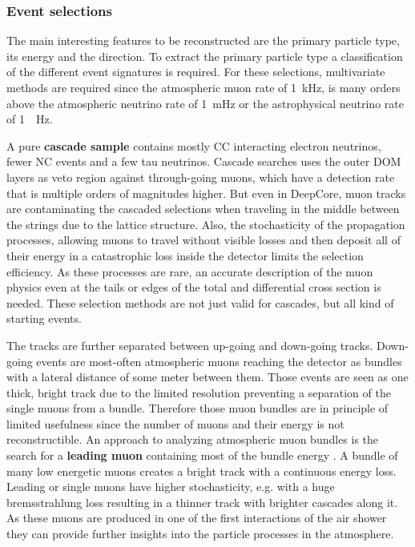 \subsubsection{Event selections}

The main interesting features to be reconstructed are the primary particle type, its energy and the direction.
To extract the primary particle type a classification of the different event signatures is required.
For these selections, multivariate methods are required since the atmospheric muon rate of \SI{1}{kHz}, is many orders above the atmospheric neutrino rate of \SI{1}{mHz} or the astrophysical neutrino rate of \SI{1}{\micro.Hz}.

A pure \textbf{cascade sample} contains mostly CC interacting electron neutrinos, fewer NC events and a few tau neutrinos.
Cascade searches \cite{IceCube20Cascades} uses the outer DOM layers as veto region against through-going muons, which have a detection rate that is multiple orders of magnitudes higher.
But even in DeepCore, muon tracks are contaminating the cascaded selections when traveling in the middle between the strings due to the lattice structure.
Also, the stochasticity of the propagation processes, allowing muons to travel without visible losses and then deposit all of their energy in a catastrophic loss inside the detector limits the selection efficiency.
As these processes are rare, an accurate description of the muon physics even at the tails or edges of the total and differential cross section is needed.
These selection methods are not just valid for cascades, but all kind of starting events.

The tracks are further separated between up-going and down-going tracks.
Down-going events are most-often atmospheric muons reaching the detector as bundles with a lateral distance of some meter between them.
Those events are seen as one thick, bright track due to the limited resolution preventing a separation of the single muons from a bundle.
Therefore those muon bundles are in principle of limited usefulness since the number of muons and their energy is not reconstructible.
An approach to analyzing atmospheric muon bundles is the search for a \textbf{leading muon} containing most of the bundle energy \cite{Fuchs16PhD, Fuchs16ECRS, Werthebach17Master}.
A bundle of many low energetic muons creates a bright track with a continuous energy loss.
Leading or single muons have higher stochasticity, e.g. with a huge bremsstrahlung loss resulting in a thinner track with brighter cascades along it.
As these muons are produced in one of the first interactions of the air shower they can provide further insights into the particle processes in the atmosphere.

